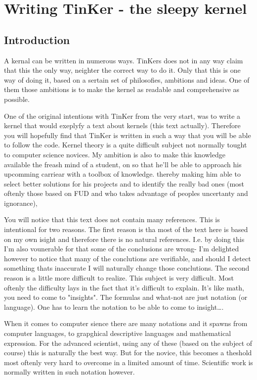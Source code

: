 \part{Writing TinKer - the sleepy kernel}
\chapter{Introduction}
A kernal can be written in numerous ways. TinKers does not in any way claim that this the only way, neighter the correct way to do it. Only that this is one way of doing it, based on a sertain set of philosofies, ambitions and ideas. One of them those ambitions is to make the kernel as readable and comprehensive as possible.

One of the original intentions with TinKer from the very start, was to write a kernel that would exeplyfy a text about kernels (this text actually). Therefore you will hopefully find that TinKer is written in such a way that you will be able to follow the code. Kernel theory is a quite difficult subject not normally tought to computer science novices. My ambition is also to make this knowledge available the freash mind of a student, on so that he'll be able to approach his upcomming carriear with a toolbox of knowledge. thereby making him able to select better solutions for his projects and to identify the really bad ones (most oftenly those based on FUD and who takes advantage of peoples uncertanty and ignorance),

You will notice that this text does not contain many references. This is intentional for two reasons. The first reason is tha most of the text here is based on my own isight and therefore there is no natural references. I.e. by doing this I'm also vounerable for that some of the conclusions are wrong- I'm delighted however to notice that many of the conclutions are verifiable, and should I detect something thats inaccurate I will naturally change those conclutions.  The second reason is a little more difficult to realize. This subject is very difficult. Most oftenly the difficulty lays in the fact that it's difficult to explain. It's like math, you need to come to "insights". The formulas and what-not are just notation (or language). One has to learn the notation to be able to come to insight\ldots.

When it comes to computer sience there are many notations and it spawns from computer languages, to grapghical descriptive languages and mathematical expression. For the advanced scientist, using any of these (based on the subject of course) this is naturally the best way. But for the novice, this becomes a theshold most oftenly very hard to overcome in a limited amount of time. Scientific work is normally written in such notation however.

